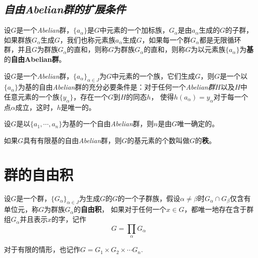 \subsection*{\textsl{自由Abelian群的扩展条件}}

\begin{define}
    设$G$是一个\textsl{Abelian}群，$\{a_\alpha\}$是$G$中元素的一个加标族，$G_\alpha$是由$a_\alpha$生成的$G$的子群，如果群族$G_\alpha$生成$G$，我们也称元素族$a_\alpha$生成$G$，如果每一个群$G_\alpha$都是无限循环群，并且$G$为群族$G_\alpha$的直和，则称$G$为群族$G_\alpha$的直和，则称$G$为以元素族$\{a_\alpha\}$为\textbf{基}的\textbf{自由Abelian群}。
\end{define}

\begin{mdframed}
    \begin{lemma}
        设$G$是一个\textsl{Abelian}群，$\{a_\alpha\}_{\alpha\in J}$为$G$中元素的一个族，它们生成$G$，则$G$是一个以$\{a_\alpha\}$为基的自由\textsl{Abelian}群的充分必要条件是：对于任何一个\textsl{Abelian群}$H$以及$H$中任意元素的一个族$\{y_\alpha\}$，存在一个$G$到$H$的同态$h$，
        使得$h(a_\alpha)=y_\alpha$对于每一个点$\alpha$成立，这时，$h$是唯一的。
    \end{lemma}
\end{mdframed}

\begin{mdframed}
    \begin{theorem}
        设$G$是以$\{a_1,\cdots,a_n\}$为基的一个自由\textsl{Abelian}群，则$n$是由$G$唯一确定的。
    \end{theorem}
\end{mdframed}

如果$G$具有有限基的自由\textsl{Abelian}群，则$G$的基元素的个数叫做$G$的\textbf{秩}。

\section{群的自由积}

\begin{mdframed}
    \begin{define}
        设$G$是一个群，$\{G_\alpha\}_{\alpha\in J}$为生成$G$的$G$的一个子群族，假设$\alpha\neq \beta$时$G_\alpha\cap G_\beta$仅含有单位元，称$G$为群族$G_\alpha$的\textbf{自由积}，
        如果对于任何一个$x\in G$，都唯一地存在含于群组$G_\alpha$并且表示$x$的字，记作
        \begin{equation}
            G=\prod_{\alpha} G_\alpha
        \end{equation}

        对于有限的情形，也记作$G=G_1\times G_2\times\cdots G_n$.
    \end{define}
\end{mdframed}

